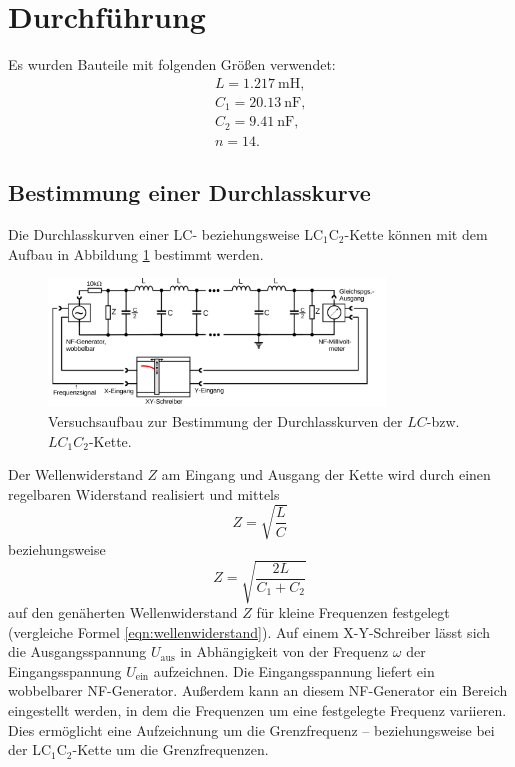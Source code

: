 \section{Durchführung}
\label{sec:Durchführung}

Es wurden Bauteile mit folgenden Größen verwendet:
\begin{gather*}
	L = \SI{1.217}{\milli\henry} \text{,} \\
	C_1 = \SI{20.13}{\nano\farad} \text{,} \\
	C_2 = \SI{9.41}{\nano\farad} \text{,} \\
	n = 14 \text{.}
\end{gather*}


\subsection{Bestimmung einer Durchlasskurve}
Die Durchlasskurven einer LC- beziehungsweise LC$_1$C$_2$-Kette können
mit dem Aufbau in Abbildung \ref{fig:durchlasskurve} bestimmt werden.
\begin{figure}
	\centering
	\includegraphics[width=0.8\textwidth]{Bilder/durchlasskurve.png}
	\caption{Versuchsaufbau zur Bestimmung der Durchlasskurven der $LC$-bzw. $LC_1C_2$-Kette. \cite{Anleitung}}
	\label{fig:durchlasskurve}
\end{figure}
Der Wellenwiderstand $Z$ am Eingang und Ausgang der Kette wird durch einen
regelbaren Widerstand realisiert und mittels
\begin{equation}
	Z = \sqrt{\frac{L}{C}}
\end{equation}
beziehungsweise
\begin{equation}
	Z = \sqrt{\frac{2L}{C_1+C_2}}
\end{equation}
auf den genäherten Wellenwiderstand $Z$ für kleine Frequenzen festgelegt (vergleiche Formel \eqref{eqn:wellenwiderstand}).
Auf einem X-Y-Schreiber lässt sich die Ausgangsspannung $U_{\text{aus}}$ in Abhängigkeit von der Frequenz $\omega$ der Eingangsspannung $U_{\text{ein}}$ aufzeichnen.
Die Eingangsspannung liefert ein wobbelbarer NF-Generator.
Außerdem kann an diesem NF-Generator ein Bereich eingestellt werden, in dem die Frequenzen um eine festgelegte Frequenz variieren.
Dies ermöglicht eine Aufzeichnung um die Grenzfrequenz -- beziehungsweise
bei der LC$_1$C$_2$-Kette um die Grenzfrequenzen.

